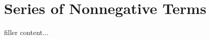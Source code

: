 \documentclass[../../templates/section]{subfiles}
\begin{document}
\section{Series of Nonnegative Terms}\label{sec:series-of-nonnegative-terms}

filler content...
\end{document}

